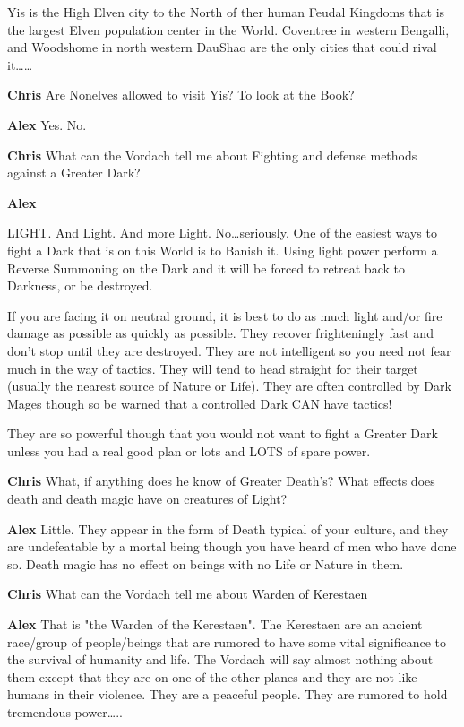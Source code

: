 Yis is the High Elven city to the North of ther human Feudal Kingdoms that 
is the largest Elven population center in the World. Coventree in western 
Bengalli, and Woodshome in north western Dau\-Shao are the only cities that 
could rival it\dots\dots

{\bf Chris} Are Non\-elves allowed to visit Yis? To look at the Book?

{\bf Alex }
Yes. No.

{\bf Chris} What can the Vordach tell me about Fighting and defense methods against 
a Greater Dark? 

{\bf Alex }

LIGHT. And Light. And more Light. No\dots seriously. One of the easiest 
ways to fight a Dark that is on this World is to Banish it. Using light 
power perform a Reverse Summoning on the Dark and it will be forced 
to retreat back to Darkness, or be destroyed.

If you are facing it on neutral ground, it is best to do as much light and/or 
fire damage as possible as quickly as possible. They recover frighteningly 
fast and don't stop until they are destroyed. They are not intelligent so you 
need not fear much in the way of tactics. They will tend to head straight 
for their target (usually the nearest source of Nature or Life). 
They are often controlled by Dark Mages though so be warned that a 
controlled Dark CAN have tactics!

They are so powerful though that you would not want to fight a Greater Dark 
unless you had a real good plan or lots and LOTS of spare power.

{\bf Chris} What, if anything does he know of Greater Death's? What effects does 
death and death magic have on creatures of Light?

{\bf Alex }
Little. They appear in the form of Death typical of your culture, and they 
are undefeatable by a mortal being\- though you have heard of men who have 
done so. Death magic has no effect on beings with no Life or Nature in them.

{\bf Chris} What can the Vordach tell me about Warden of Kerestaen

{\bf Alex }
That is "the Warden of the Kerestaen". The Kerestaen are an ancient race/group 
of people/beings that are rumored to have some vital significance to the 
survival 
of humanity and life. The Vordach will say almost nothing about them except 
that they are on one of the other planes and they are not like humans in 
their violence. They are a peaceful people. They are rumored to hold 
tremendous power\dots..

